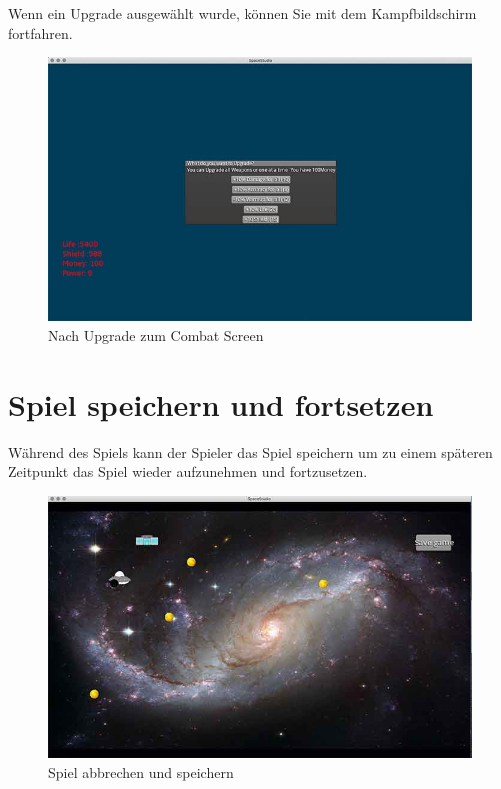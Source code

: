 \documentclass[12pt]{article}
\begin{document}
Wenn ein Upgrade ausgewählt wurde, können Sie mit dem Kampfbildschirm fortfahren.
\begin{figure}[htp]
\centering
\includegraphics[scale=0.6]{TestProtocolBilder/upgrade@0,25x.jpg}
\caption{Nach Upgrade zum Combat Screen}
\end{figure}

\newpage
\section{Spiel speichern und fortsetzen}
Während des Spiels kann der Spieler das Spiel speichern um zu einem späteren Zeitpunkt das Spiel wieder aufzunehmen und fortzusetzen.
\begin{figure}[htp]
	\centering
	\includegraphics[scale=0.6]{TestProtocolBilder/continue1@0,25x.jpg}
	\caption{Spiel abbrechen und speichern}
\end{figure}
\end{document}
